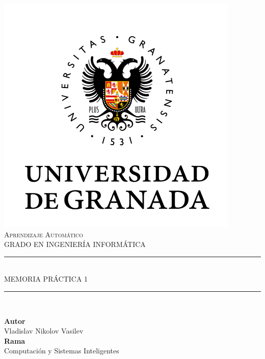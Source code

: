 \documentclass[11pt,a4paper]{article}
\begin{document}

\begin{titlepage}

\begin{minipage}{\textwidth}

\centering

\includegraphics[scale=0.5]{img/ugr.png}\\

\textsc{\Large Aprendizaje Automático\\[0.2cm]}
\textsc{GRADO EN INGENIERÍA INFORMÁTICA}\\[1cm]

\noindent\rule[-1ex]{\textwidth}{1pt}\\[1.5ex]
\textsc{{\Huge MEMORIA PRÁCTICA 1\\}}
\noindent\rule[-1ex]{\textwidth}{2pt}\\[3.5ex]

\end{minipage}

\vspace{1.5cm}

\begin{minipage}{\textwidth}

\centering

\textbf{Autor}\\ {Vladislav Nikolov Vasilev}\\[2.5ex]
\textbf{Rama}\\ {Computación y Sistemas Inteligentes}\\[2.5ex]
\vspace{0.3cm}


\end{minipage}
\end{titlepage}
\end{document}
